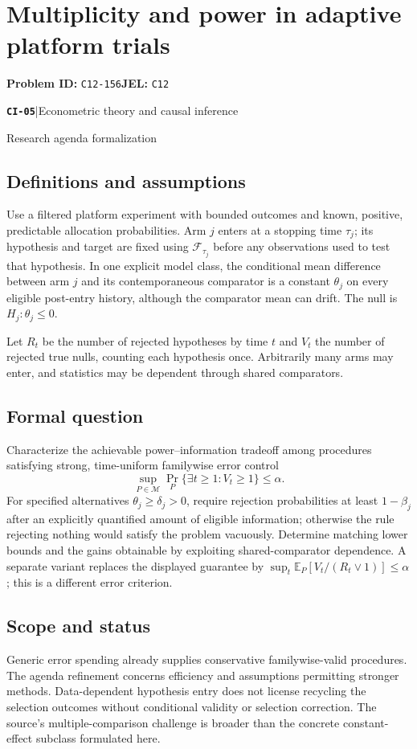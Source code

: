 \documentclass[11pt,a4paper]{article}
\newcommand{\E}{\mathbb E}
\newcommand{\entrymeta}[3]{{\sffamily\small\color{muted}\textbf{\texttt{#1}}\quad|\quad #2\par #3\par}}
\begin{document}
\section*{Multiplicity and power in adaptive platform trials}
\textbf{Problem ID:} \texttt{C12-156}\quad \textbf{JEL:} \texttt{C12}\par
\label{problem:OP-0484}
\label{beyond:CI-05}
\entrymeta{CI-05}{Econometric theory and causal inference}{Research agenda formalization}
\subsection*{Definitions and assumptions}
Use a filtered platform experiment with bounded outcomes and known, positive, predictable allocation probabilities. Arm $j$ enters at a stopping time $\tau_j$; its hypothesis and target are fixed using $\mathcal F_{\tau_j}$ before any observations used to test that hypothesis. In one explicit model class, the conditional mean difference between arm $j$ and its contemporaneous comparator is a constant $\theta_j$ on every eligible post-entry history, although the comparator mean can drift. The null is $H_j:\theta_j\leq0$.

Let $R_t$ be the number of rejected hypotheses by time $t$ and $V_t$ the number of rejected true nulls, counting each hypothesis once. Arbitrarily many arms may enter, and statistics may be dependent through shared comparators.
\subsection*{Formal question}
Characterize the achievable power--information tradeoff among procedures satisfying strong, time-uniform familywise error control
\[
\sup_{P\in\mathcal M}\Pr_P\{\exists t\geq1:V_t\geq1\}
\leq\alpha.
\]
For specified alternatives $\theta_j\geq\delta_j>0$, require rejection probabilities at least $1-\beta_j$ after an explicitly quantified amount of eligible information; otherwise the rule rejecting nothing would satisfy the problem vacuously. Determine matching lower bounds and the gains obtainable by exploiting shared-comparator dependence. A separate variant replaces the displayed guarantee by $\sup_t\E_P[V_t/(R_t\vee1)]\leq\alpha$; this is a different error criterion.
\subsection*{Scope and status}
Generic error spending already supplies conservative familywise-valid procedures. The agenda refinement concerns efficiency and assumptions permitting stronger methods. Data-dependent hypothesis entry does not license recycling the selection outcomes without conditional validity or selection correction. The source's multiple-comparison challenge is broader than the concrete constant-effect subclass formulated here.
\end{document}
